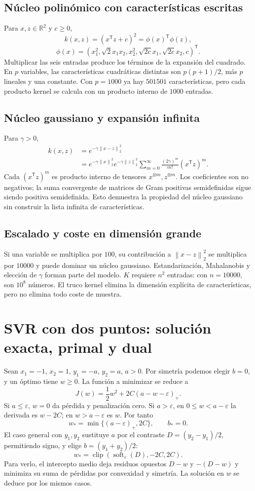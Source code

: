 \documentclass[11pt,a4paper]{article}
\newcommand{\R}{\mathbb R}
\newcommand{\T}{^{\mathsf T}}
\newcommand{\norm}[1]{\left\lVert #1\right\rVert}
\theoremstyle{definition}
\begin{document}
\subsection{Núcleo polinómico con características escritas}
Para $x,z\in\R^2$ y $c\ge0$,
\[
k(x,z)=(x\T z+c)^2=\phi(x)\T\phi(z),
\]
\[
\phi(x)=(x_1^2,\sqrt2x_1x_2,x_2^2,\sqrt{2c}x_1,\sqrt{2c}x_2,c)\T.
\]
Multiplicar las seis entradas produce los términos de la expansión del cuadrado. En $p$ variables, las características cuadráticas distintas son $p(p+1)/2$, más $p$ lineales y una constante. Con $p=1000$ ya hay $501501$ características, pero cada producto kernel se calcula con un producto interno de $1000$ entradas.
\subsection{Núcleo gaussiano y expansión infinita}
Para $\gamma>0$,
\begin{align*}
k(x,z)&=e^{-\gamma\norm{x-z}_2^2}\\
&=e^{-\gamma\norm x_2^2}e^{-\gamma\norm z_2^2}
\sum_{m=0}^\infty\frac{(2\gamma)^m}{m!}(x\T z)^m.
\end{align*}
Cada $(x\T z)^m$ es producto interno de tensores $x^{\otimes m},z^{\otimes m}$. Los coeficientes son no negativos; la suma convergente de matrices de Gram positivas semidefinidas sigue siendo positiva semidefinida. Esto demuestra la propiedad del núcleo gaussiano sin construir la lista infinita de características.
\subsection{Escalado y coste en dimensión grande}
Si una variable se multiplica por $100$, su contribución a $\norm{x-z}_2^2$ se multiplica por $10000$ y puede dominar un núcleo gaussiano. Estandarización, Mahalanobis y elección de $\gamma$ forman parte del modelo. $K$ requiere $n^2$ entradas: con $n=10000$, son $10^8$ números. El truco kernel elimina la dimensión explícita de características, pero no elimina todo coste de muestra.

\section{SVR con dos puntos: solución exacta, primal y dual}
Sean $x_1=-1$, $x_2=1$, $y_1=-a$, $y_2=a$, $a>0$. Por simetría podemos elegir $b=0$, y un óptimo tiene $w\ge0$. La función a minimizar se reduce a
\[
J(w)=\frac12w^2+2C(a-w-\varepsilon)_+.
\]
Si $a\le\varepsilon$, $w=0$ da pérdida y penalización cero. Si $a>\varepsilon$, en $0\le w<a-\varepsilon$ la derivada es $w-2C$; en $w>a-\varepsilon$ es $w$. Por tanto
\[
\boxed{w_* =\min\{(a-\varepsilon)_+,2C\},\qquad b_*=0}.
\]
El caso general con $y_1,y_2$ sustituye $a$ por el contraste $D=(y_2-y_1)/2$, permitiendo signo, y elige $b=(y_1+y_2)/2$:
\[
w_* =\operatorname{clip}\!\left(\operatorname{soft}_\varepsilon(D),-2C,2C\right).
\]
Para verlo, el intercepto medio deja residuos opuestos $D-w$ y $-(D-w)$ y minimiza su suma de pérdidas por convexidad y simetría. La solución en $w$ se deduce por los mismos casos.
\end{document}
